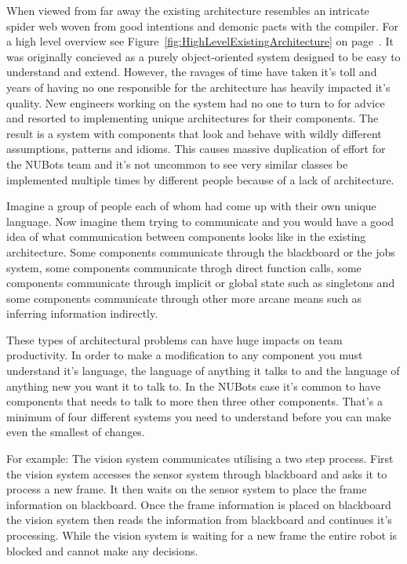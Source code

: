 \documentclass[english,12pt]{scrartcl}
\begin{document}
			When viewed from far away the existing architecture resembles an intricate spider web
			woven from good intentions and demonic pacts with the compiler.
			For a high level overview see Figure~\ref{fig:HighLevelExistingArchitecture} on page~\pageref{fig:HighLevelExistingArchitecture}.
			It was originally concieved as a purely object-oriented system designed to be easy to understand and extend.
			However, the ravages of time have taken it's toll and years of having no one responsible for
			the architecture has heavily impacted it's quality.
			New engineers working on the system had no one to turn to for advice and resorted to
			implementing unique architectures for their components.
			The result is a system with components that look and behave with wildly different assumptions, patterns and
			idioms.
			This causes massive duplication of effort for the NUBots team and it's not uncommon to see very similar classes be
			implemented multiple times by different people because of a lack of architecture.

			Imagine a group of people each of whom had come up with their own unique language.
			Now imagine them trying to communicate and you would have a good idea of what communication
			between components looks like in the existing architecture.
			Some components communicate through the blackboard or the jobs system, some components communicate throgh
			direct function calls, some components communicate through implicit or global state such as singletons and some
			components communicate through other more arcane means such as inferring information indirectly.

			These types of architectural problems can have huge impacts on team productivity.
			In order to make a modification to any component you must understand it's language, the language of anything
			it talks to and the language of anything new you want it to talk to. In the NUBots case it's common to have components
			that needs to talk to more then three other components.
			That's a minimum of four different systems you need to understand before you can make even the smallest of changes.

			For example: The vision system communicates utilising a two step process.
			First the vision system accesses the sensor system through blackboard and asks it to process a new frame.
			It then waits on the sensor system to place the frame information on blackboard.
			Once the frame information is placed on blackboard the vision system then reads the information
			from blackboard and continues it's processing.
			While the vision system is waiting for a new frame the entire robot is blocked and cannot make any decisions.
\end{document}
